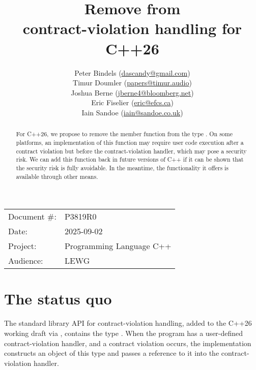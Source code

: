 

 \usepackage[bottom]{footmisc} 



\title{Remove  from \\ contract-violation handling for C++26}
\author{
  Peter Bindels \small(\href{mailto:dascandy@gmail.com}{dascandy@gmail.com}) \\
  Timur Doumler \small(\href{mailto:papers@timur.audio}{papers@timur.audio}) \\
  Joshua Berne \small(\href{mailto:jberne4@bloomberg.net}{jberne4@bloomberg.net}) \\ 
  Eric Fiselier \small(\href{mailto:eric@efcs.ca}{eric@efcs.ca}) \\
  Iain Sandoe \small(\href{mailto:iain@sandoe.co.uk}{iain@sandoe.co.uk})
}
\date{}
\maketitle

\begin{tabular}{ll}
Document \#: & P3819R0 \\
Date: &2025-09-02 \\
Project: & Programming Language C++ \\
Audience: & LEWG
\end{tabular}

\begin{abstract}
For C++26, we propose to remove the member function  from the type . On some platforms, an implementation of this function may require user code execution after a contract violation but before the contract-violation handler, which may pose a security risk. We can add this function back in future versions of C++ if it can be shown that the security risk is fully avoidable. In the meantime, the functionality it offers is available through other means.
\end{abstract}


\section{The status quo}

The standard library API for contract-violation handling, added to the C++26 working draft \cite{N5014} via \cite{P2900R14}, contains the type . When the program has a user-defined contract-violation handler, and a contract violation occurs, the implementation constructs an object of this type and passes a reference to it into the contract-violation handler.

